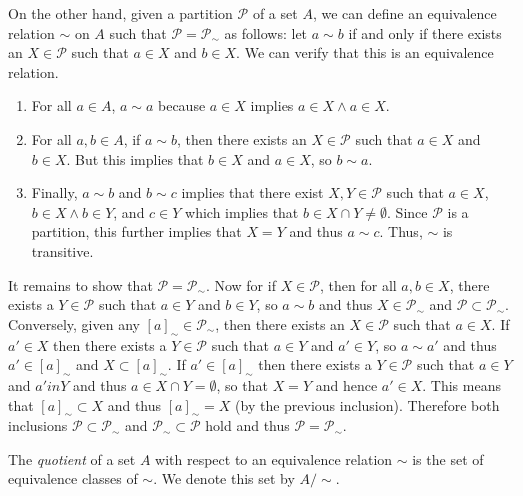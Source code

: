 On the other hand, given a partition \(\mathcal{P}\) of a set \(A\), we can
define an equivalence relation \(\sim\) on \(A\) such that \(\mathcal{P} =
\mathcal{P}_{\sim}\) as follows: let \(a \sim b\) if and only if there exists an
\(X \in \mathcal{P}\) such that \(a \in X\) and \(b \in X\). We can verify that
this is an equivalence relation.
\begin{enumerate}[label=(\alph*), wide, itemsep=0pt]
    \item For all \(a \in A\), \(a \sim a\) because \(a \in X\) implies \(a \in
    X \land a \in X\).
    \item For all \(a, b \in A\), if \(a \sim b\), then there exists an \(X \in
    \mathcal{P}\) such that \(a \in X\) and \(b \in X\). But this implies that
    \(b \in X\) and \(a \in X\), so \(b \sim a\).
    \item Finally, \(a \sim b\) and \(b \sim c\) implies that there exist \(X, Y
    \in \mathcal{P}\) such that \(a \in X\), \(b \in X \land b \in Y\), and \(c
    \in Y\) which implies that \(b \in X \cap Y \neq \emptyset\). Since
    \(\mathcal{P}\) is a partition, this further implies that \(X = Y\) and thus
    \(a \sim c\). Thus, \(\sim\) is transitive.
\end{enumerate}

It remains to show that \(\mathcal{P} = \mathcal{P}_{\sim}\). Now for if \(X \in
\mathcal{P}\), then for all \(a, b \in X\), there exists a \(Y \in \mathcal{P}\)
such that \(a \in Y\) and \(b \in Y\), so \(a \sim b\) and thus \(X \in
\mathcal{P}_{\sim}\) and \(\mathcal{P} \subset \mathcal{P}_{\sim}\). Conversely,
given any \([a]_{\sim} \in \mathcal{P}_{\sim}\), then there exists an \(X \in
\mathcal{P}\) such that \(a \in X\). If \(a' \in X\) then there exists a \(Y \in
\mathcal{P}\) such that \(a \in Y\) and \(a' \in Y\), so \(a \sim a'\) and thus
\(a' \in [a]_{\sim}\) and \(X \subset [a]_{\sim}\). If \(a' \in [a]_{\sim}\)
then there exists a \(Y \in \mathcal{P}\) such that \(a \in Y\) and \(a' in Y\)
and thus \(a \in X \cap Y = \emptyset\), so that \(X = Y\) and hence \(a' \in
X\). This means that \([a]_{\sim} \subset X\) and thus \([a]_{\sim} = X\) (by
the previous inclusion). Therefore both inclusions \(\mathcal{P} \subset
\mathcal{P}_{\sim}\) and \(\mathcal{P}_{\sim} \subset \mathcal{P}\) hold and
thus \(\mathcal{P} = \mathcal{P}_{\sim}\).

\begin{definition}
    The \emph{quotient} of a set \(A\) with respect to an equivalence relation
    \(\sim\) is the set of equivalence classes of \(\sim\). We denote this set
    by \(A/\sim\).
\end{definition}

